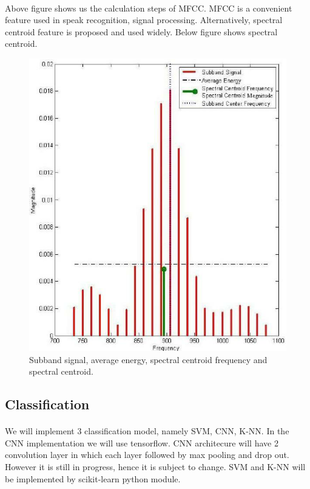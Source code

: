 \documentclass[10pt,twocolumn,letterpaper]{article}
\begin{document}
\paragraph{} Above figure shows us the calculation steps of MFCC\cite{mfcc_calc}. MFCC is a convenient feature used in speak recognition, signal processing. Alternatively, spectral centroid feature is proposed and used widely. Below figure shows spectral centroid.\cite{spec_centroid}
\begin{figure}[t]
  \begin{center}
  \includegraphics[width=0.8\linewidth]{images/spec_centroid.png}
  \end{center}  
     \caption{Subband signal, average energy, spectral centroid frequency and spectral centroid\cite{spec_centroid}.}
  \label{fig:mffc}
  \label{fig:onecol}
\end{figure} 

\subsection{Classification}
\paragraph{}We will implement 3 classification model, namely SVM, CNN, K-NN. In the CNN implementation we will use tensorflow. CNN architecure will have 2 convolution layer in which each layer followed by max pooling and drop out. However it is still in progress, hence it is subject to change. SVM and K-NN will be implemented by scikit-learn python module.
\end{document}
